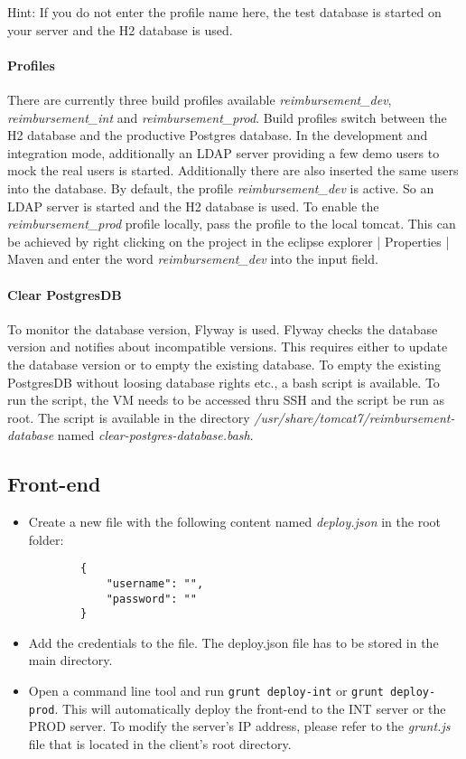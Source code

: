Hint: If you do not enter the profile name here, the test database is started on your server and the H2 database is used.

\paragraph{Profiles}
There are currently three build profiles available \textit{reimbursement\_dev},  \textit{reimbursement\_int} and \textit{reimbursement\_prod}. Build profiles switch between the H2 database and the productive Postgres database. In the development and integration mode, additionally an LDAP server providing a few demo users to mock the real users is started. Additionally there are also inserted the same users into the database. \newline
By default, the profile \textit{reimbursement\_dev} is active. So an LDAP server is started and the H2 database is used. To enable the \textit{reimbursement\_prod} profile locally, pass the profile to the local tomcat. This can be achieved by right clicking on the project in the eclipse explorer | Properties | Maven and enter the word \textit{reimbursement\_dev} into the input field.

\paragraph{Clear PostgresDB}
\label{sec:clear-postgresdb}
To monitor the database version, Flyway is used. Flyway checks the database version and notifies about incompatible versions. This requires either to update the database version or to empty the existing database. To empty the existing PostgresDB without loosing database rights etc., a bash script is available. To run the script, the VM needs to be accessed thru SSH and the script be run as root. The script is available in the directory \textit{/usr/share/tomcat7/reimbursement-database} named \textit{clear-postgres-database.bash}.

\subsection{Front-end}

\begin{itemize}

    \item Create a new file with the following content named \textit{deploy.json} in the root folder:
    \begin{lstlisting}
        {
            "username": "",
            "password": ""
        }
    \end{lstlisting}
    \item Add the credentials to the file. The deploy.json file has to be stored in the main directory.
    \item Open a command line tool and run \texttt{grunt deploy-int} or \texttt{grunt deploy-prod}. This will automatically deploy the front-end to the INT server or the PROD server. To modify the server's IP address, please refer to the \textit{grunt.js} file that is located in the client's root directory. 
    
\end{itemize}

